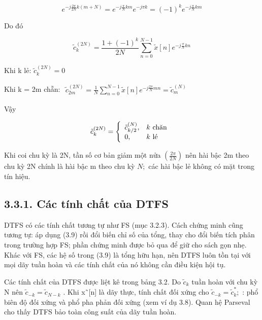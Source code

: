 \documentclass[
  10
]{article}
\begin{document}
\[
e ^ {- j \frac {2 \pi}{2 N} k (m + N)} = e ^ {- j \frac {\pi}{N} k m} e ^ {- j \pi k} = (- 1) ^ {k} e ^ {- j \frac {\pi}{N} k m}
\]

Do đó

\[
\tilde {c} _ {k} ^ {(2 N)} = \frac {1 + (- 1) ^ {k}}{2 N} \sum_ {n = 0} ^ {N - 1} \tilde {x} [ n ] e ^ {- j \frac {\pi}{N} k n}
\]

Khi k lẻ: \(\tilde { c } _ { k } ^ { ( 2 N ) } = 0\)

Khi k = 2m chẵn:
\(\begin{array} { r } { \tilde { c } _ { 2 m } ^ { ( 2 N ) } = \frac { 1 } { N } \sum _ { n = 0 } ^ { N - 1 } \tilde { x } [ n ] e ^ { - j \frac { 2 \pi } { N } m n } = \tilde { c } _ { m } ^ { ( N ) } } \end{array}\)

Vậy

\[
\tilde {c} _ {k} ^ {(2 N)} = \left\{ \begin{array}{l l} \tilde {c} _ {k / 2} ^ {(N)}, & k \text {   chăn } \\ 0, & k \text {   l\'e } \end{array} \right.
\]

Khi coi chu kỳ là 2N, tần số cơ bản giảm một nửa
\(\textstyle \left( { \frac { 2 \pi } { 2 N } } \right)\) nên hài bậc 2m
theo chu kỳ 2N chính là hài bậc m theo chu kỳ \(N ;\) các hài bậc lẻ
không có mặt trong tín hiệu. 

\subsection{3.3.1. Các tính chất của
DTFS}\label{cuxe1c-tuxednh-chux1ea5t-cux1ee7a-dtfs}

DTFS có các tính chất tương tự như FS (mục 3.2.3). Cách chứng minh cũng
tương tự: áp dụng (3.9) rồi đổi biến chỉ số của tổng, thay cho đổi biến
tích phân trong trường hợp FS; phần chứng minh được bỏ qua để giữ cho
sách gọn nhẹ. Khác với FS, các hệ số trong (3.9) là tổng hữu hạn, nên
DTFS luôn tồn tại với mọi dãy tuần hoàn và các tính chất của nó không
cần điều kiện hội tụ.

Các tính chất của DTFS được liệt kê trong bảng 3.2. Do
\(\tilde { c } _ { k }\) tuần hoàn với chu kỳ N nên
\(\tilde { c } _ { - k } = \tilde { c } _ { N - k }\) . Khi x˜{[}n{]} là
dãy thực, tính chất đối xứng cho
\(\tilde { c } _ { - k } = \tilde { c } _ { k } ^ { \ast } ;\) : phổ
biên độ đối xứng và phổ pha phản đối xứng (xem ví dụ 3.8). Quan hệ
Parseval cho thấy DTFS bảo toàn công suất của dãy tuần hoàn.
\end{document}
